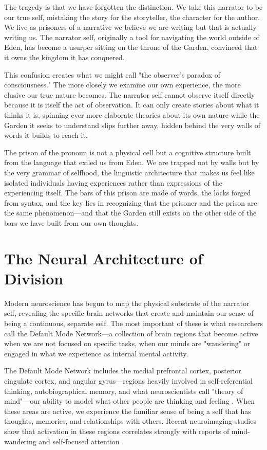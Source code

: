 The tragedy is that we have forgotten the distinction. We take this narrator to be our true self, mistaking the story for the storyteller, the character for the author. We live as prisoners of a narrative we believe we are writing but that is actually writing us. The narrator self, originally a tool for navigating the world outside of Eden, has become a usurper sitting on the throne of the Garden, convinced that it owns the kingdom it has conquered.

This confusion creates what we might call "the observer's paradox of consciousness." The more closely we examine our own experience, the more elusive our true nature becomes. The narrator self cannot observe itself directly because it is itself the act of observation. It can only create stories about what it thinks it is, spinning ever more elaborate theories about its own nature while the Garden it seeks to understand slips further away, hidden behind the very walls of words it builds to reach it.

The prison of the pronoun is not a physical cell but a cognitive structure built from the language that exiled us from Eden. We are trapped not by walls but by the very grammar of selfhood, the linguistic architecture that makes us feel like isolated individuals having experiences rather than expressions of the experiencing itself. The bars of this prison are made of words, the locks forged from syntax, and the key lies in recognizing that the prisoner and the prison are the same phenomenon—and that the Garden still exists on the other side of the bars we have built from our own thoughts.

\section{The Neural Architecture of Division}

Modern neuroscience has begun to map the physical substrate of the narrator self, revealing the specific brain networks that create and maintain our sense of being a continuous, separate self. The most important of these is what researchers call the Default Mode Network—a collection of brain regions that become active when we are not focused on specific tasks, when our minds are "wandering" or engaged in what we experience as internal mental activity.

The Default Mode Network includes the medial prefrontal cortex, posterior cingulate cortex, and angular gyrus—regions heavily involved in self-referential thinking, autobiographical memory, and what neuroscientists call "theory of mind"—our ability to model what other people are thinking and feeling \parencite{raichle2001default,buckner2008brain}. When these areas are active, we experience the familiar sense of being a self that has thoughts, memories, and relationships with others. Recent neuroimaging studies show that activation in these regions correlates strongly with reports of mind-wandering and self-focused attention \parencite{christoff2009experience,andrews2013evidence}.

